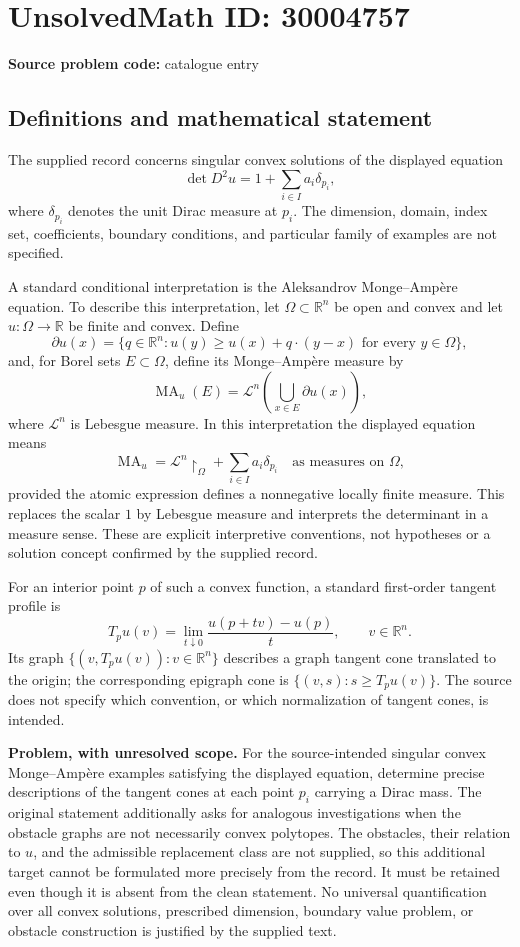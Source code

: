 \documentclass[11pt]{article}
\newcommand{\R}{\mathbb{R}}
\begin{document}
\section*{UnsolvedMath ID: 30004757}
\textbf{Source problem code:} catalogue entry
\subsection{Definitions and mathematical statement}
The supplied record concerns singular convex solutions of the displayed equation
\[
\det D^2u=1+\sum_{i\in I}a_i\delta_{p_i},
\]
where \(\delta_{p_i}\) denotes the unit Dirac measure at \(p_i\). The dimension, domain, index set, coefficients, boundary conditions, and particular family of examples are not specified.

A standard conditional interpretation is the Aleksandrov Monge--Amp\`ere equation. To describe this interpretation, let \(\Omega\subset\R^n\) be open and convex and let \(u:\Omega\to\R\) be finite and convex. Define
\[
\partial u(x)=\{q\in\R^n:u(y)\ge u(x)+q\cdot(y-x)\text{ for every }y\in\Omega\},
\]
and, for Borel sets \(E\subset\Omega\), define its Monge--Amp\`ere measure by
\[
\operatorname{MA}_u(E)=\mathcal L^n\!\left(\bigcup_{x\in E}\partial u(x)\right),
\]
where \(\mathcal L^n\) is Lebesgue measure. In this interpretation the displayed equation means
\[
\operatorname{MA}_u=\mathcal L^n\!\restriction_\Omega+\sum_{i\in I}a_i\delta_{p_i}
\quad\text{as measures on }\Omega,
\]
provided the atomic expression defines a nonnegative locally finite measure. This replaces the scalar \(1\) by Lebesgue measure and interprets the determinant in a measure sense. These are explicit interpretive conventions, not hypotheses or a solution concept confirmed by the supplied record.

For an interior point \(p\) of such a convex function, a standard first-order tangent profile is
\[
T_pu(v)=\lim_{t\downarrow0}\frac{u(p+tv)-u(p)}{t},\qquad v\in\R^n.
\]
Its graph \(\{(v,T_pu(v)):v\in\R^n\}\) describes a graph tangent cone translated to the origin; the corresponding epigraph cone is \(\{(v,s):s\ge T_pu(v)\}\). The source does not specify which convention, or which normalization of tangent cones, is intended.

\textbf{Problem, with unresolved scope.} For the source-intended singular convex Monge--Amp\`ere examples satisfying the displayed equation, determine precise descriptions of the tangent cones at each point \(p_i\) carrying a Dirac mass. The original statement additionally asks for analogous investigations when the obstacle graphs are not necessarily convex polytopes. The obstacles, their relation to \(u\), and the admissible replacement class are not supplied, so this additional target cannot be formulated more precisely from the record. It must be retained even though it is absent from the clean statement. No universal quantification over all convex solutions, prescribed dimension, boundary value problem, or obstacle construction is justified by the supplied text.
\end{document}

